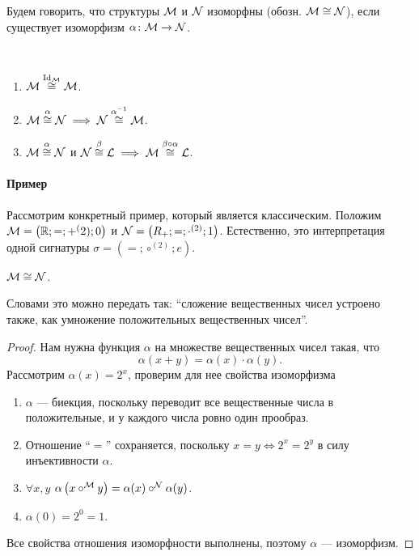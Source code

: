 \begin{definition}
    Будем говорить, что структуры $\mathcal{M}$ и $\mathcal{N}$ изоморфны (обозн. $\mathcal{M} \cong \mathcal{N}$), если существует изоморфизм $\alpha \colon \mathcal{M} \to \mathcal{N}$.
\end{definition}

\begin{statement}~
    \begin{enumerate}
        \item $\mathcal{M} \overset{\mathrm{Id}_{\mathcal{M}}}{\cong} \mathcal{M}$.
        \item $\mathcal{M} \overset{\alpha}{\cong} \mathcal{N} \implies \mathcal{N} \overset{\alpha^{-1}}{\cong} \mathcal{M}$.
        \item $\mathcal{M} \overset{\alpha}{\cong} \mathcal{N}$ и $\mathcal{N} \overset{\beta}{\cong} \mathcal{L} \implies \mathcal{M} \overset{\beta \circ \alpha}{\cong} \mathcal{L}$.
    \end{enumerate}
\end{statement}

\paragraph{Пример}
Рассмотрим конкретный пример, который является классическим.
Положим $\mathcal{M} = \left( \mathbb{R}; =; +^(2); 0 \right)$ и $\mathcal{N} = \left( R_{+}; =; \cdot^{(2)}; 1 \right)$.
Естественно, это интерпретация одной сигнатуры $\sigma = \left( =; \circ^{(2)}; e \right)$.
\begin{statement}
    $\mathcal{M} \cong \mathcal{N}$.
\end{statement}
Словами это можно передать так: \enquote{сложение вещественных чисел устроено также, как умножение положительных вещественных чисел}.
\begin{proof}
    Нам нужна функция $\alpha$ на множестве вещественных чисел такая, что
    $$
        \alpha(x + y) = \alpha(x) \cdot \alpha(y).
    $$
    Рассмотрим $\alpha(x) = 2^{x}$, проверим для нее свойства изоморфизма
    \begin{enumerate}
        \item $\alpha$ --- биекция, поскольку переводит все вещественные числа в положительные, и у каждого числа ровно один прообраз.
        \item Отношение \enquote{$=$} сохраняется, поскольку $x = y \iff 2^{x} = 2^{y}$ в силу инъективности $\alpha$.
        \item $\forall x, y$ $\alpha\left(x \circ^{\mathcal{M}} y\right) = \alpha(x) \circ^{\mathcal{N}} \alpha(y)$.
        \item $\alpha(0) = 2^{0} = 1$.
    \end{enumerate}
    Все свойства отношения изоморфности выполнены, поэтому $\alpha$ --- изоморфизм.
\end{proof}


